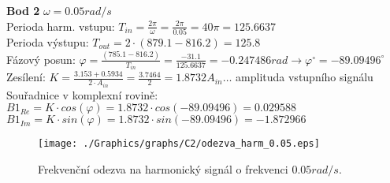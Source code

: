 \documentclass{article}
\begin{document}
			\noindent
			\textbf{Bod 2 }$\omega=0.05 rad/s$\\
			Perioda harm. vstupu: \(T_{in}=\frac{2\pi}{\omega}=\frac{2\pi}{0.05}=40\pi=125.6637\)\\
			Perioda výstupu: \(T_{out}=2\cdot(879.1-816.2)=125.8\)\\
			Fázový posun: \(\varphi=\frac{(785.1-816.2)}{T_{in}}=\frac{-31.1}{125.6637}=-0.247486 rad\rightarrow \varphi^{\circ}=-89.09496^{\circ}\)\\
			Zesílení: \(K=\frac{3.153+0.5934}{2\cdot A_{in}}=\frac{3.7464}{2}=1.8732\)\hspace{1cm}\(A_{in}\dots\) amplituda vstupního signálu\\
			Souřadnice v komplexní rovině:\\
			\(B1_{Re}=K\cdot cos(\varphi)=1.8732\cdot cos(-89.09496)=0.029588\)\\
			\(B1_{Im}=K\cdot sin(\varphi)=1.8732\cdot sin(-89.09496)=-1.872966\)
			\begin{figure}[H]
				\centering
				\texttt{[image: ./Graphics/graphs/C2/odezva\_harm\_0.05.eps]}
				\caption{Frekvenční odezva na harmonický signál o frekvenci \(0.05 rad/s\).}
				\label{pic:bod2}
			\end{figure}
			
\end{document}
